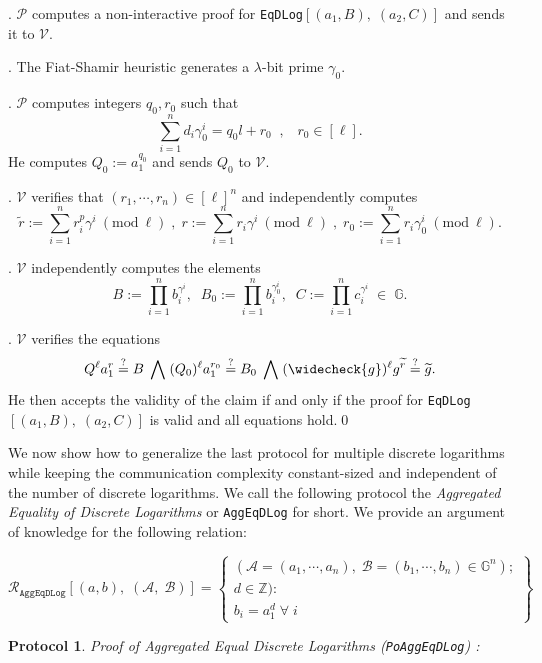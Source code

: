 \documentclass[11pt, lettersize, notitlepage, leqno, footskip=0.6cm]{article}
\newcommand{\slim}{\sum\limits}
\newcommand{\ttt}{\texttt}
\newcommand{\wti}{\widetilde}
\newcommand{\mc}{\mathcal}
\newcommand{\mb}{\mathbb}
\newcommand{\lam}{\lambda}
\newcommand{\weck}{\widecheck}
\newcommand{\mP}{\mc{P}}
\newcommand{\V}{\mc{V}}
\newcommand{\vs}{\vspace{-0.15cm}}
\newcommand{\noin}{\noindent}
\newcommand{\sta}{\stackrel{?}{=}}
\newcommand{\Mod}[1]{\ (\mathrm{mod}\ #1)}
\newtheorem{Prot}[Thm]{Protocol}
\numberwithin{equation}{section}
\begin{document}
{\begin{enumerate}[wide, labelwidth=!, labelindent=0pt]
. $\mc{P}$ computes a non-interactive proof for \verb|EqDLog|$[(a_1, B),\; (a_2, C)]$ and sends it to $\mc{V}$.

\noin 8. The Fiat-Shamir heuristic generates a $\lam$-bit prime $\gamma_0$.

\noin 9. $\mP$ computes integers $q_0,r_0$ such that \vs $$\slim_{i=1}^n d_i\gamma_0^i = q_0l+r_0\;\;,\;\;\;r_0\in[\ell] .$$ He computes $Q_0:= a_1^{q_0}$ and sends $Q_0$ to $\V$.

. $\V$ verifies that $(r_1,\cdots,r_n)\in [\ell]^n$ and independently computes \vs $$\wti{r}:= \slim_{i=1}^n r_i^{p}\gamma^i \Mod{\ell}\;,\;r:= \slim_{i=1}^n r_i\gamma^i \Mod{\ell}\;,\;r_0:= \slim_{i=1}^n r_i\gamma_0^i \Mod{\ell}.$$

\noin 11. $\V$ independently computes the elements \vs $$B:= \prod\limits_{i=1}^n b_i^{\gamma^i},\;\;B_0:= \prod\limits_{i=1}^n b_i^{\gamma_0^i},\;\;   C:= \prod\limits_{i=1}^n c_i^{\gamma^i}\;\in\; \mb{G}.$$

\noin 12. $\V$ verifies the equations \vs $$Q^{\ell}a_1^{r}\sta B\;\bigwedge\;(Q_0)^{\ell}a_1^{r_0}\sta B_0\;\bigwedge\; (\weck{g})^{\ell}g^{\wti{r}}\sta \wti{g} .$$ He then accepts the validity of the claim if and only if the proof for \verb|EqDLog|$[(a_1, B),\; (a_2, C)]$ is valid and all equations hold.\qed\end{enumerate}


\noindent We now show how to generalize the last protocol for multiple discrete logarithms while keeping the communication complexity constant-sized and independent of the number of discrete logarithms. We call the following protocol the \textit{Aggregated Equality of Discrete Logarithms} or \verb|AggEqDLog| for short. We provide an argument of knowledge for  the following relation:

\[
  \mc{R}_{{\ttt{AggEqDLog}}}[(a, b),\;(\mc{A},\;\mc{B})] = \left\{\begin{array}{l}
    (\mc{A} = (a_1, \cdots, a_n),\;\mc{B} = (b_1,\cdots, b_n)\in\mb{G}^n);\\
    d\in\mb{Z}): \\
    b_i = a_1^{d} \;\forall\;i
  \end{array}\right\}
\]

\vspace{0.1cm}

\begin{Prot} \normalfont \textit{Proof of Aggregated Equal Discrete Logarithms} (\verb|PoAggEqDLog|) :\end{Prot} \vspace{-0.3cm}

}
\end{document}
